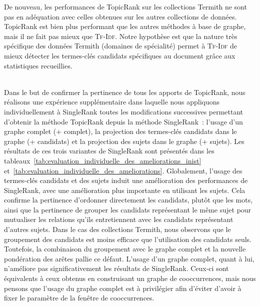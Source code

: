         De nouveau, les performances de TopicRank sur les collections Termith ne
        sont pas en adéquation avec celles obtenues sur les autres collections
        de données. TopicRank est bien plus performant que les autres méthodes à
        base de graphe, mais il ne fait pas mieux que \textsc{Tf-Idf}. Notre
        hypothèse est que la nature très spécifique des données Termith
        (domaines de spécialité) permet à \textsc{Tf-Idf} de mieux détecter les
        termes-clés candidats spécifiques au document grâce aux statistiques
        recueillies.

        ~\\Dans le but de confirmer la pertinence de tous les apports de
        TopicRank, nous réalisons une expérience supplémentaire dans laquelle
        nous appliquons individuellement à SingleRank toutes les modifications
        successives permettant d'obtenir la méthode TopicRank depuis la méthode
        SingleRank~: l'usage d'un graphe complet (+ complet), la projection des
        termes-clés candidats dans le graphe (+ candidats) et la projection des
        sujets dans le graphe (+ sujets). Les résultats de ces trois variantes
        de SingleRank sont présentés dans les
        tableaux~\ref{tab:evaluation_individuelle_des_ameliorations_inist}
        et~\ref{tab:evaluation_individuelle_des_ameliorations}. Globalement,
        l'usage des termes-clés candidats et des sujets induit une amélioration
        des performances de SingleRank, avec une amélioration plus importante en
        utilisant les sujets. Cela confirme la pertinence d'ordonner directement
        les candidats, plutôt que les mots, ainsi que la pertinence de grouper
        les candidats représentant le même sujet pour mutualiser les relations
        qu'ils entretiennent avec les candidats représentant d'autres sujets.
        Dans le cas des collections Termith, nous observons que le groupement
        des candidats est moins efficace que l'utilisation des candidats seuls.
        Toutefois, la combinaison du groupement avec le graphe complet et la
        nouvelle pondération des arêtes pallie ce défaut. L'usage d'un graphe
        complet, quant à lui, n'améliore pas significativement les résultats de
        SingleRank. Ceux-ci sont équivalents à ceux obtenus en construisant un
        graphe de cooccurrences, mais nous pensons que l'usage du graphe complet
        est à privilégier afin d'éviter d'avoir à fixer le paramètre de la
        fenêtre de cooccurrences.
